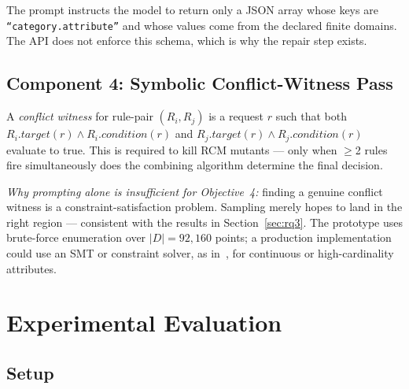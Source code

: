 \documentclass[conference]{IEEEtran}
\begin{document}
The prompt instructs the model to return only a JSON array whose keys are
\texttt{``category.attribute''} and whose values come from the declared finite
domains. The API does not enforce this schema, which is why the repair step
exists.

\subsection{Component 4: Symbolic Conflict-Witness Pass}

A \textit{conflict witness} for rule-pair $(R_i, R_j)$ is a request $r$ such
that both $R_i.\mathit{target}(r) \wedge R_i.\mathit{condition}(r)$ and
$R_j.\mathit{target}(r) \wedge R_j.\mathit{condition}(r)$ evaluate to true.
This is required to kill RCM mutants --- only when $\geq$2 rules fire
simultaneously does the combining algorithm determine the final decision.

\textit{Why prompting alone is insufficient for Objective~4:} finding a genuine
conflict witness is a constraint-satisfaction problem. Sampling merely hopes
to land in the right region --- consistent with the results in
Section~\ref{sec:rq3}. The prototype uses brute-force enumeration over
$|D|{=}92{,}160$ points; a production implementation could use an SMT or constraint
solver, as in~\cite{b3,b4}, for continuous or high-cardinality attributes.

\section{Experimental Evaluation}

\subsection{Setup}
\end{document}
